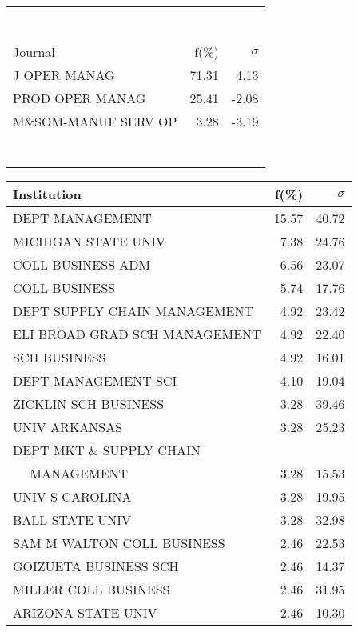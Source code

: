 \documentclass[a4paper,11pt]{report}
\begin{document}
\begin{landscape}
\begin{table}[!ht]
{\begin{tabular}{|l r  r|}
 &  & \\
 &  & \\
 &  & \\
 &  & \\
 &  & \\
 &  & \\
 &  & \\
\hline
\hline
Journal & f(\%) & $\sigma$\\
\hline
J OPER MANAG & 71.31 & 4.13\\
PROD OPER MANAG & 25.41 & -2.08\\
M\&SOM-MANUF SERV OP & 3.28 & -3.19\\
 &  & \\
 &  & \\
 &  & \\
 &  & \\
 &  & \\
 &  & \\
 &  & \\
\hline
\end{tabular}
}
{\scriptsize\begin{tabular}{|l r r|}
\hline
Institution & f(\%) & $\sigma$\\
\hline
DEPT MANAGEMENT & 15.57 & 40.72\\
MICHIGAN STATE UNIV & 7.38 & 24.76\\
COLL BUSINESS ADM & 6.56 & 23.07\\
COLL BUSINESS & 5.74 & 17.76\\
DEPT SUPPLY CHAIN MANAGEMENT & 4.92 & 23.42\\
ELI BROAD GRAD SCH MANAGEMENT & 4.92 & 22.40\\
SCH BUSINESS & 4.92 & 16.01\\
DEPT MANAGEMENT SCI & 4.10 & 19.04\\
ZICKLIN SCH BUSINESS & 3.28 & 39.46\\
UNIV ARKANSAS & 3.28 & 25.23\\
DEPT MKT \& SUPPLY CHAIN &  & \\
$\quad$ MANAGEMENT & 3.28 & 15.53\\
UNIV S CAROLINA & 3.28 & 19.95\\
BALL STATE UNIV & 3.28 & 32.98\\
SAM M WALTON COLL BUSINESS & 2.46 & 22.53\\
GOIZUETA BUSINESS SCH & 2.46 & 14.37\\
MILLER COLL BUSINESS & 2.46 & 31.95\\
ARIZONA STATE UNIV & 2.46 & 10.30\\

\end{tabular}}
\end{table}
\end{landscape}
\end{document}
